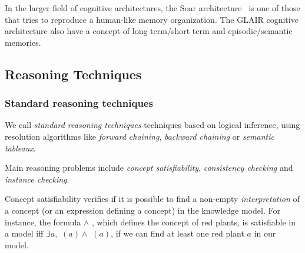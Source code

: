 In the larger field of cognitive architectures, the {\sc Soar}
architecture~\cite{Lehman2006} is one of those that tries to reproduce a
human-like memory organization. The GLAIR cognitive architecture also have a
concept of long term/short term and episodic/semantic memories.

\subsection{Reasoning Techniques}
\label{sect|reasoning}

\begin{scriptsize}
\begin{center}
\end{center}
\end{scriptsize}


\subsubsection{Standard reasoning techniques}
\label{sect|std-reasoning}

We call \emph{standard reasoning techniques} techniques based on logical
inference, using resolution algorithms like \emph{forward chaining},
\emph{backward chaining} or \emph{semantic tableaux}.

Main reasoning problems include \emph{concept satisfiability},
\emph{consistency checking} and \emph{instance checking}.

Concept satisfiability verifies if it is possible to find a non-empty
\emph{interpretation} of a concept (or an expression defining a concept) in the
knowledge model. For instance, the formula  $\land$
, which defines the concept of red plants, is satisfiable in a
model  iff $\exists a, $ $(a) \land$
$(a)$, \ie if we can find at least one red plant $a$ in our
model.

